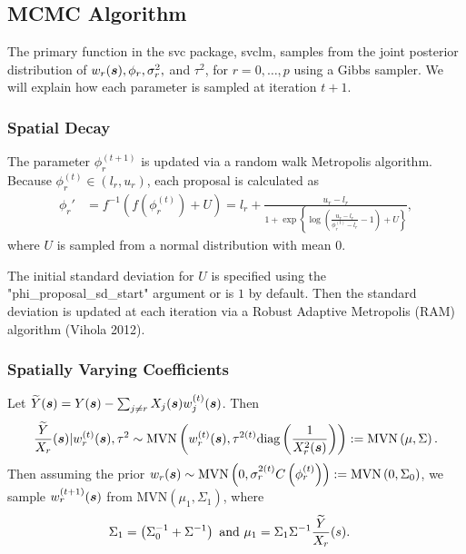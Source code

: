 \subsection{MCMC Algorithm}
\label{sec:mcmc}

The primary function in the svc package, svclm, samples from the joint posterior distribution of $w_r(\boldsymbol{s}), \phi_r, \sigma_r^2,$ and $\tau^2$, for $r = 0, \dots, p$ using a Gibbs sampler. We will explain how each parameter is sampled at iteration $t+1$.

\subsubsection{Spatial Decay}
\label{sec:spatial_decay}

The parameter $\phi_r^{(t+1)}$ is updated via a random walk Metropolis algorithm. Because $\phi_r^{(t)} \in (l_r, u_r)$, each proposal is calculated as 
\begin{align*}
    \phi_r' &= f^{-1}(f(\phi_r^{(t)}) + U) = l_r + \frac{u_r - l_r}{1 + \exp\left\{\log\left(\frac{u_r - l_r}{\phi_r^{(t)} - l_r} - 1\right) + U\right\}},
\end{align*}
where $U$ is sampled from a normal distribution with mean $0$.

The initial standard deviation for $U$ is specified using the "phi\_proposal\_sd\_start" argument or is $1$ by default. Then the standard deviation is updated at each iteration via a Robust Adaptive Metropolis (RAM) algorithm (Vihola 2012).

\subsubsection{Spatially Varying Coefficients}
\label{sec:svcs}

Let $\widetilde{Y}(\boldsymbol{s}) = Y(\boldsymbol{s}) - \sum_{j\neq r} X_j(\boldsymbol{s})w_j^{(t)}(\boldsymbol{s})$. Then
\begin{align*}
    \frac{\widetilde{Y}}{X_r}(\boldsymbol{s}) | w_r^{(t)}(\boldsymbol{s}), \tau^2 \sim \text{MVN} \left(w_r^{(t)}(\boldsymbol{s}), \tau^{2(t)} \text{diag}\left( \frac{1}{X_r^2(\boldsymbol{s})} \right)\right) := \text{MVN} \left(\mu, \Sigma\right).
\end{align*}
Then assuming the prior $w_r(\boldsymbol{s}) \sim \text{MVN}\left(0, \sigma_r^{2(t)} C\left(\phi_r^{(t)}\right)\right) := \text{MVN}\left(0, \Sigma_0\right)$, we sample $w_r^{(t+1)}(\boldsymbol{s})$ from MVN$(\mu_1, \Sigma_1)$, where
\begin{align*}
    \Sigma_1 &= \left(\Sigma_0^{-1} + \Sigma^{-1}\right) \text{ and }
    \mu_1 = \Sigma_1 \Sigma^{-1} \frac{\widetilde{Y}}{X_r}(s).
\end{align*}

